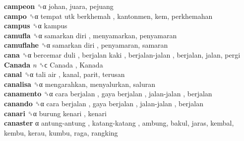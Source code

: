 \textbf{campeon} ␝α  johan, juara, pejuang  \\
\textbf{campo} ␝α   tempat utk berkhemah , kantonmen, kem, perkhemahan  \\
\textbf{campus} ␝α  kampus  \\
\textbf{camufla} ␝α   samarkan diri , menyamarkan, penyamaran  \\
\textbf{camuflahe} ␝α   samarkan diri , penyamaran, samaran  \\
\textbf{cana} ␝α   bercemar duli ,  berjalan kaki ,  berjalan-jalan , berjalan, jalan, pergi  \\
\textbf{Canada} \emph{n}  ␝ϲ   Canada ,  Kanada   \\
\textbf{canal} ␝α   tali air , kanal, parit, terusan  \\
\textbf{canalisa} ␝α  mengarahkan, menyalurkan, saluran  \\
\textbf{canamento} ␝α   cara berjalan ,  gaya berjalan ,  jalan-jalan , berjalan  \\
\textbf{canando} ␝α   cara berjalan ,  gaya berjalan ,  jalan-jalan , berjalan  \\
\textbf{canari} ␝α   burung kenari , kenari  \\
\textbf{canaster} α   antung-antung ,  katang-katang , ambung, bakul, jaras, kembal, kembu, kerau, kumbu, raga, rangking  \\
